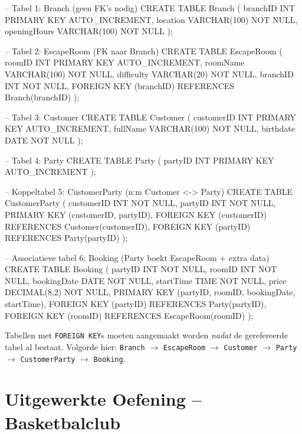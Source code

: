 \documentclass[a4paper,11pt]{article}
\begin{document}
\begin{sqllisting}
-- Tabel 1: Branch (geen FK's nodig)
CREATE TABLE Branch (
    branchID      INT          PRIMARY KEY AUTO_INCREMENT,
    location      VARCHAR(100) NOT NULL,
    openingHours  VARCHAR(100) NOT NULL
);

-- Tabel 2: EscapeRoom (FK naar Branch)
CREATE TABLE EscapeRoom (
    roomID      INT          PRIMARY KEY AUTO_INCREMENT,
    roomName    VARCHAR(100) NOT NULL,
    difficulty  VARCHAR(20)  NOT NULL,
    branchID    INT          NOT NULL,
    FOREIGN KEY (branchID) REFERENCES Branch(branchID)
);

-- Tabel 3: Customer
CREATE TABLE Customer (
    customerID  INT          PRIMARY KEY AUTO_INCREMENT,
    fullName    VARCHAR(100) NOT NULL,
    birthdate   DATE         NOT NULL
);

-- Tabel 4: Party
CREATE TABLE Party (
    partyID  INT  PRIMARY KEY AUTO_INCREMENT
);

-- Koppeltabel 5: CustomerParty  (n:m Customer <-> Party)
CREATE TABLE CustomerParty (
    customerID  INT  NOT NULL,
    partyID     INT  NOT NULL,
    PRIMARY KEY (customerID, partyID),
    FOREIGN KEY (customerID) REFERENCES Customer(customerID),
    FOREIGN KEY (partyID)    REFERENCES Party(partyID)
);

-- Associatieve tabel 6: Booking  (Party boekt EscapeRoom + extra data)
CREATE TABLE Booking (
    partyID      INT      NOT NULL,
    roomID       INT      NOT NULL,
    bookingDate  DATE     NOT NULL,
    startTime    TIME     NOT NULL,
    price        DECIMAL(8,2) NOT NULL,
    PRIMARY KEY (partyID, roomID, bookingDate, startTime),
    FOREIGN KEY (partyID) REFERENCES Party(partyID),
    FOREIGN KEY (roomID)  REFERENCES EscapeRoom(roomID)
);
\end{sqllisting}

\begin{waarschuwing}
Tabellen met \texttt{FOREIGN KEY}s moeten aangemaakt worden \emph{nadat} de gerefereerde tabel al bestaat.
Volgorde hier: \texttt{Branch} $\to$ \texttt{EscapeRoom} $\to$ \texttt{Customer} $\to$ \texttt{Party} $\to$ \texttt{CustomerParty} $\to$ \texttt{Booking}.
\end{waarschuwing}

\section{Uitgewerkte Oefening -- Basketbalclub}
\end{document}
